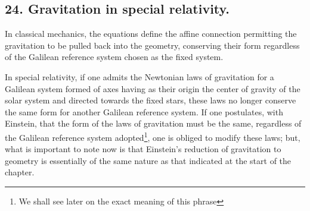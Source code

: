 \subsection*{24. Gravitation in special relativity.}

In classical mechanics, the equations
define the affine connection permitting the gravitation to be pulled back into the geometry, conserving their form regardless of the Galilean reference system chosen as the fixed system.

In special relativity, if one admits the Newtonian laws of gravitation for a Galilean system formed of axes having as their origin the center of gravity of the solar system and directed towards the fixed stars, these laws no longer conserve the same form for another Galilean reference system. If one postulates, with Einstein, that the form of the laws of gravitation must be the same, regardless of the Galilean reference system adopted\footnote{We shall see later on the exact meaning of this phrase}, one is obliged to modify these laws; but, what is important to note now is that Einstein's reduction of gravitation to geometry is essentially of the same nature as that indicated at the start of the chapter.


